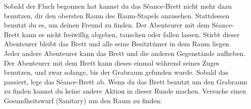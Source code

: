     \begin{itemize}
        \bitem Sobald der Fluch begonnen hat kannst du das Séance-Brett nicht mehr dazu benutzen, dir den obersten Raum des Raum-Stapels anzusehen. Stattdessen benutzt du es, um deinen Freund zu finden.
        \bitem Der Abenteurer mit dem Séance-Brett kann es nicht freiwillig abgeben, tauschen oder fallen lassen. Stirbt dieser Abenteurer bleibt das Brett und alle seine Besitztümer in dem Raum liegen.
       Jeder andere Abenteurer kann das Brett und die anderen Gegenstände aufheben.
        \bitem Der Abenteurer mit dem Brett kann dieses einmal während seines Zuges benutzen, und zwar solange, bis der Grabraum gefunden wurde. Sobald das passiert, lege das Séance-Brett ab.
        \bitem Wenn du das Brett benutzt um den Grabraum zu finden kannst du keine andere Aktion in dieser Runde machen. Versuche einen Gesundheitswurf (Sanitary) um den Raum zu finden:
    \end{itemize}

    \rolls
    \erolls

